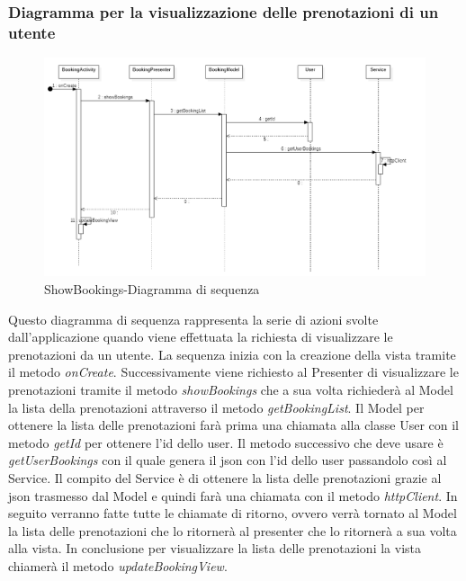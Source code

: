 \subsubsection{Diagramma per la visualizzazione delle prenotazioni di un utente}
\begin{figure}[H]
	\centering
	\includegraphics[width=16cm]{res/images/showBookingsSeq.png}
	\caption{ShowBookings-Diagramma di sequenza}
	\label{fig:ShowBookings-Diagramma di sequenza}
\end{figure}
Questo diagramma di sequenza rappresenta la serie di azioni svolte dall'applicazione quando viene effettuata la richiesta di visualizzare le prenotazioni da un utente.
La sequenza inizia con la creazione della vista tramite il metodo \textit{onCreate}. Successivamente viene richiesto al Presenter di visualizzare le prenotazioni tramite il metodo \textit{showBookings} che a sua volta richiederà al Model la lista della prenotazioni attraverso il metodo \textit{getBookingList}.
Il Model per ottenere la lista delle prenotazioni farà prima una chiamata alla classe User con il metodo \textit{getId} per ottenere l'id dello user.
Il metodo successivo che deve usare è \textit{getUserBookings} con il quale genera il json con l'id dello user passandolo così al Service.
Il compito del Service è di ottenere la lista delle prenotazioni grazie al json trasmesso dal Model e quindi farà una chiamata con il metodo \textit{httpClient}.
In seguito verranno fatte tutte le chiamate di ritorno, ovvero verrà tornato al Model la lista delle prenotazioni che lo ritornerà al presenter che lo ritornerà a sua volta alla vista.
In conclusione per visualizzare la lista delle prenotazioni la vista chiamerà il metodo \textit{updateBookingView}.  

